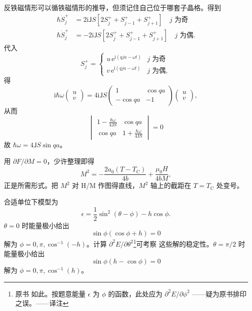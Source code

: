  反铁磁情形可以循铁磁情形的推导，但须记住自己位于哪套子晶格。得到
\begin{equation*}
\begin{aligned}
\hbar\dot{S}_j^{+} &= 2\mathrm{i}\mathsf{J}S[2S_j^{+}+S_{j-1}^{+}+S_{j+1}^{+}] \quad j \text{ 为奇}\\
\hbar\dot{S}_j^{+} &= -2\mathrm{i}\mathsf{J}S[2S_j^{+}+S_{j-1}^{+}+S_{j+1}^{+}] \quad j \text{ 为偶}.
\end{aligned}\tag{F.64}
\end{equation*}
代入
\begin{equation*}
S_j^{+} = \begin{cases} u\,\mathrm{e}^{\mathrm{i}(qja-\omega t)} & j \text{ 为奇}\\ v\,\mathrm{e}^{\mathrm{i}(qja-\omega t)} & j \text{ 为偶}, \end{cases}\tag{F.65}
\end{equation*}
得
\begin{equation*}
\mathrm{i}\hbar\omega\begin{pmatrix}u\\v\end{pmatrix} = 4\mathrm{i}\mathsf{J}S\begin{pmatrix} 1 & \cos qa\\ -\cos qa & -1 \end{pmatrix}\begin{pmatrix}u\\v\end{pmatrix},\tag{F.66}
\end{equation*}
从而
\begin{equation*}
\begin{vmatrix} 1-\frac{\hbar\omega}{4\mathsf{J}S} & \cos qa\\ \cos qa & 1+\frac{\hbar\omega}{4\mathsf{J}S} \end{vmatrix} = 0\tag{F.67}
\end{equation*}
故 $\hbar\omega=4\mathsf{J}S\sin qa$。

 用 $\partial F/\partial M=0$，少许整理即得
\begin{equation*}
M^{2} = -\frac{2a_0(T-T_{\mathrm{C}})}{4b} + \frac{\mu_0H}{4bM},\tag{F.68}
\end{equation*}
正是所需形式。把 $M^{2}$ 对 H/M 作图得直线，$M^{2}$ 轴上的截距在 $T=T_{\mathrm{C}}$
处变号。

 合适单位下模型为
\begin{equation*}
\epsilon = \frac{1}{2}\sin^{2}(\theta-\phi) - h\cos\phi.\tag{F.69}
\end{equation*}
$\theta=0$ 时能量极小给出
\begin{equation*}
\sin\phi(\cos\phi+h) = 0\tag{F.70}
\end{equation*}
解为 $\phi=0, \pi, \cos^{-1}(-h)$。计算 $\partial^{2}E/\partial\theta^{2}$\footnote{原书
如此。按题意能量 $\epsilon$ 为 $\phi$ 的函数，此处应为 $\partial^{2}E/\partial\phi^{2}$
——疑为原书排印之误。——译注}可考察
这些解的稳定性。$\theta=\pi/2$ 时能量极小给出
\begin{equation*}
\sin\phi(h-\cos\phi) = 0\tag{F.71}
\end{equation*}
解为 $\phi=0, \pi, \cos^{-1}(h)$。

